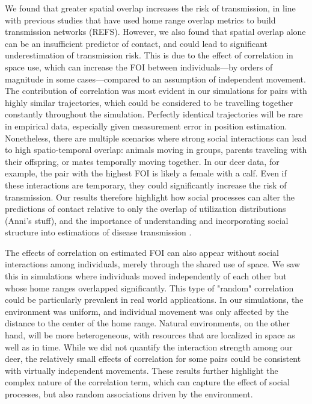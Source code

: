 \documentclass[letterpaper]{article}
\begin{document}
We found that greater spatial overlap increases the risk of transmission, in line with previous studies that have used home range overlap metrics to build transmission networks (REFS). However, we also found that spatial overlap alone can be an insufficient predictor of contact, and could lead to significant underestimation of transmission risk. This is due to the effect of correlation in space use, which can increase the FOI between individuals---by orders of magnitude in some cases---compared to an assumption of independent movement. The contribution of correlation was most evident in our simulations for pairs with highly similar trajectories, which could be considered to be travelling together constantly throughout the simulation. Perfectly identical trajectories will be rare in empirical data, especially given measurement error in position estimation. Nonetheless, there are multiple scenarios where strong social interactions can lead to high spatio-temporal overlap: animals moving in groups, parents traveling with their offspring, or mates temporally moving together.  In our deer data, for example, the pair with the highest FOI is likely a female with a calf.  Even if these interactions are temporary, they could significantly increase the risk of transmission. Our results therefore highlight how social processes can alter the predictions of contact relative to only the overlap of utilization distributions (Anni's stuff), and the importance of understanding and incorporating social structure into estimations of disease transmission \citep{Sah2018, Webber2023}.

The effects of correlation on estimated FOI can also appear without social interactions among individuals, merely through the shared use of space. We saw this in simulations where individuals moved independently of each other but whose home ranges overlapped significantly. This type of "random" correlation could be particularly prevalent in real world applications. In our simulations, the environment was uniform, and individual movement was only affected by the distance to the center of the home range. Natural environments, on the other hand, will be more heterogeneous, with resources that are localized in space as well as in time. While we did not quantify the interaction strength among our deer, the relatively small effects of correlation for some pairs could be consistent with virtually independent movements. These results further highlight the complex nature of the correlation term, which can capture the effect of social processes, but also random associations driven by the environment. 
\end{document}
